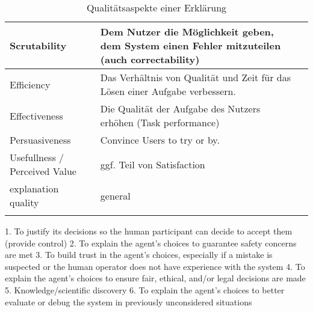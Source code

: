 \begin{longtable}{|p{}|p{}|p{}|}
    Scrutability      & Dem Nutzer die Möglichkeit geben, dem System einen Fehler mitzuteilen (auch correctability) \cite{martin_evaluating_2021}  & \cite{nunes_systematic_2017} \cite{chazette_knowledge_nodate} \cite{tintarev_designing_nodate} \cite{balog_measuring_2020} \cite{tintarev2015explaining} \cite{martin_developing_2019} \cite{gunning2019darpa}  \cite{tintarev2007survey}\\ \hline
    Efficiency      & Das Verhältnis von Qualität und Zeit für das Lösen einer Aufgabe verbessern. & \cite{nunes_systematic_2017} \cite{chazette_knowledge_nodate} \cite{tintarev_designing_nodate} \cite{balog_measuring_2020} \cite{tsai_evaluating_2019} \cite{tintarev2015explaining} \cite{hernandez-bocanegra_effects_2020} \cite{tintarev2007survey}\\ \hline
    Effectiveness      & Die Qualität der Aufgabe des Nutzers erhöhen (Task performance) \cite{martin_evaluating_2021} & \cite{nunes_systematic_2017} \cite{chazette_knowledge_nodate} \cite{tintarev_designing_nodate} \cite{balog_measuring_2020} \cite{tintarev2015explaining} \cite{zolotas_towards_2019} \cite{hernandez-bocanegra_effects_2020} \cite{martin_evaluating_2021} \cite{rjoob_towards_2021} \cite{tintarev2007survey} \\ \hline
    Persuasiveness      & Convince Users to try or by. \cite{balog_measuring_2020} & \cite{nunes_systematic_2017} \cite{tintarev_designing_nodate} \cite{balog_measuring_2020} \cite{sato_context_nodate} \cite{sato_context_nodate} \cite{abdulrahman_belief-based_2019} \cite{tintarev2015explaining} \cite{sato_action-triggering_2019} \cite{tintarev2007survey} \\ \hline
    Usefullness / Perceived Value & ggf. Teil von Satisfaction & \cite{sato_context_nodate} \cite{chazette_knowledge_nodate} \cite{sato_action-triggering_2019} \\ \hline
   explanation quality  & general & \cite{hernandez-bocanegra_effects_2020} \cite{kunkel_let_2019} \\ \hline
\caption{Qualitätsaspekte einer Erklärung}
\label{tab:quality_aspects_of_explanation}
\end{longtable}

1. To justify its decisions so the human participant can decide to accept them (provide control) 2. To explain the agent’s choices to guarantee safety concerns are met 3. To build trust in the agent’s choices, especially if a mistake is suspected or the human operator does not have experience with the system 4. To explain the agent’s choices to ensure fair, ethical, and/or legal decisions are made 5. Knowledge/scientific discovery 6. To explain the agent’s choices to better evaluate or debug the system in previously unconsidered situations \cite{rosenfeld_explainability_2019}

